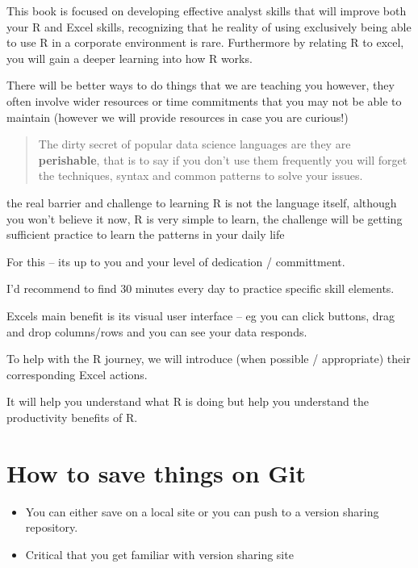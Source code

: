 \documentclass[
  letterpaper,
  DIV=11,
  numbers=noendperiod]{scrreprt}
\providecommand{\tightlist}{%
  \setlength{\itemsep}{0pt}\setlength{\parskip}{0pt}}\usepackage{longtable,booktabs,array}
\begin{document}
This book is focused on developing effective analyst skills that will
improve both your R and Excel skills, recognizing that he reality of
using exclusively being able to use R in a corporate environment is
rare. Furthermore by relating R to excel, you will gain a deeper
learning into how R works.

There will be better ways to do things that we are teaching you however,
they often involve wider resources or time commitments that you may not
be able to maintain (however we will provide resources in case you are
curious!)

\begin{quote}
The dirty secret of popular data science languages are they are
\textbf{perishable}, that is to say if you don't use them frequently you
will forget the techniques, syntax and common patterns to solve your
issues.
\end{quote}

the real barrier and challenge to learning R is not the language itself,
although you won't believe it now, R is very simple to learn, the
challenge will be getting sufficient practice to learn the patterns in
your daily life

For this -- its up to you and your level of dedication / committment.

I'd recommend to find 30 minutes every day to practice specific skill
elements.

Excels main benefit is its visual user interface -- eg you can click
buttons, drag and drop columns/rows and you can see your data responds.

To help with the R journey, we will introduce (when possible /
appropriate) their corresponding Excel actions.

It will help you understand what R is doing but help you understand the
productivity benefits of R.

\chapter{How to save things on Git}\label{how-to-save-things-on-git}

\begin{itemize}
\tightlist
\item
  You can either save on a local site or you can push to a version
  sharing repository.
\item
  Critical that you get familiar with version sharing site
\end{itemize}
\end{document}
